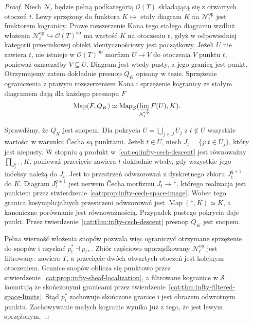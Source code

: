 \begin{proof}
Niech $\mathcal N_t$ będzie pełną podkategorią $\mathcal O(T)$ składającą się z otwartych otoczeń $t$. Lewy sprzężony do funktora $K\mapsto$ stały diagram $K$ na $\mathcal N_t^{\mathrm{op}}$ jest funktorem kogranicy. Prawe rozszerzenie Kana tego stałego diagramu wzdłuż włożenia $\mathcal N_t^{\mathrm{op}}\hookrightarrow\mathcal O(T)^{\mathrm{op}}$ ma wartość $K$ na otoczeniu $t$, gdyż w odpowiedniej kategorii przecinkowej obiekt identycznościowy jest początkowy. Jeżeli $U$ nie zawiera $t$, nie istnieje w $\mathcal O(T)^{\mathrm{op}}$ morfizm $U\to V$ do otoczenia $V$ punktu $t$, ponieważ oznaczałby $V\subseteq U$. Diagram jest wtedy pusty, a jego granicą jest punkt. Otrzymujemy zatem dokładnie presnop $Q_K$ opisany w tezie. Sprzężenie ograniczenia z prawym rozszerzeniem Kana i sprzężenie kogranicy ze stałym diagramem dają dla każdego presnopu $F$
\[
 \operatorname{Map}(F,Q_K)
 \simeq\operatorname{Map}_{\mathcal S}
       (\varinjlim_{\mathcal N_t^{\mathrm{op}}}F(U),K).
\]

Sprawdźmy, że $Q_K$ jest snopem. Dla pokrycia $U=\bigcup_{j\in J}U_j$ z $t\notin U$ wszystkie wartości w warunku Čecha są punktami. Jeżeli $t\in U$, niech $J_t=\{j:t\in U_j\}$, który jest niepusty. W stopniu $q$ produkt w~\eqref{cat:eq:infty-cech-descent} jest równoważny $\prod_{J_t^{q+1}}K$, ponieważ przecięcie zawiera $t$ dokładnie wtedy, gdy wszystkie jego indeksy należą do $J_t$. Jest to przestrzeń odwzorowań z dyskretnego zbioru $J_t^{q+1}$ do $K$. Diagram $J_t^{q+1}$ jest nerwem Čecha morfizmu $J_t\to *$, którego realizacja jest punktem przez stwierdzenie~\ref{cat:prop:infty-cech-space-image}. Wobec tego granica kosymplicjalnych przestrzeni odwzorowań jest $\operatorname{Map}(*,K)\simeq K$, a kanoniczne porównanie jest równoważnością. Przypadek pustego pokrycia daje punkt. Przez twierdzenie~\ref{cat:thm:infty-cech-descent} presnop $Q_K$ jest snopem.

Pełna wierność włożenia snopów pozwala więc ograniczyć otrzymane sprzężenie do snopów i uzyskać $p_t^*\dashv p_{t*}$. Zbiór częściowo uporządkowany $\mathcal N_t^{\mathrm{op}}$ jest filtrowany: zawiera $T$, a przecięcie dwóch otwartych otoczeń jest kolejnym otoczeniem. Granice snopów oblicza się punktowo przez stwierdzenie~\ref{cat:prop:infty-sheaf-localization}, a filtrowane kogranice w $\mathcal S$ komutują ze skończonymi granicami przez twierdzenie~\ref{cat:thm:infty-filtered-space-limits}. Stąd $p_t^*$ zachowuje skończone granice i jest obrazem odwrotnym punktu. Zachowywanie małych kogranic wynika już z tego, że jest lewym sprzężonym.
\end{proof}

